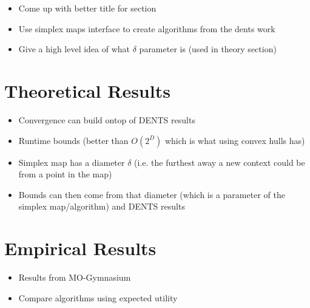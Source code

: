     \begin{itemize}
        \item Come up with better title for section
        \item Use simplex maps interface to create algorithms from the dents work 
        \item Give a high level idea of what $\delta$ parameter is (used in theory section)
    \end{itemize}

\section{Theoretical Results}
\label{sec:6-4-theory}

    \begin{itemize}
        \item Convergence can build ontop of DENTS results
        \item Runtime bounds (better than $O(2^D)$ which is what using convex hulls has)
        \item Simplex map has a diameter $\delta$ (i.e. the furthest away a new context could be from a point in the map)
        \item Bounds can then come from that diameter (which is a parameter of the simplex map/algorithm) and DENTS results
    \end{itemize}

\section{Empirical Results}
\label{sec:6-5-results}

    \begin{itemize}
        \item Results from MO-Gymnasium
        \item Compare algorithms using expected utility
    \end{itemize}